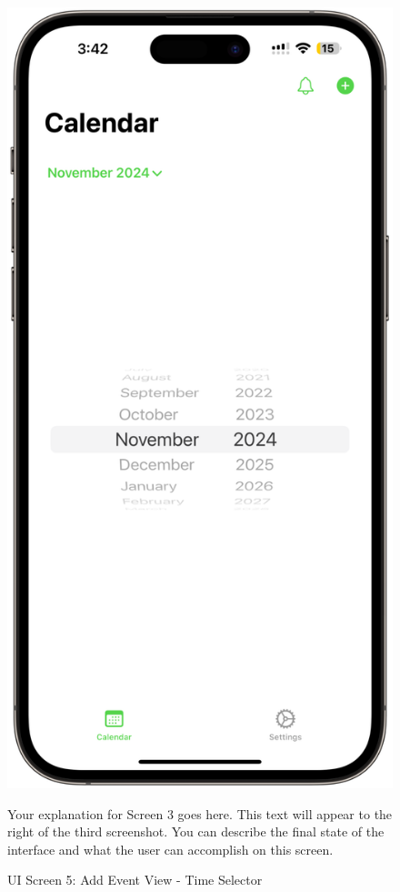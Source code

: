 \begin{figure}[!h]
    \begin{minipage}{0.3\textwidth}
        \centering
        \includegraphics[width=\textwidth]{images/screen5.png}
        \caption{UI Screen 5: Add Event View - Time Selector}
        \label{fig:ui-screen-5}
    \end{minipage}
    \hfill
    \begin{minipage}{0.65\textwidth}
        Your explanation for Screen 3 goes here. This text will appear to the right 
        of the third screenshot. You can describe the final state of the interface 
        and what the user can accomplish on this screen.
    \end{minipage}
\end{figure}

